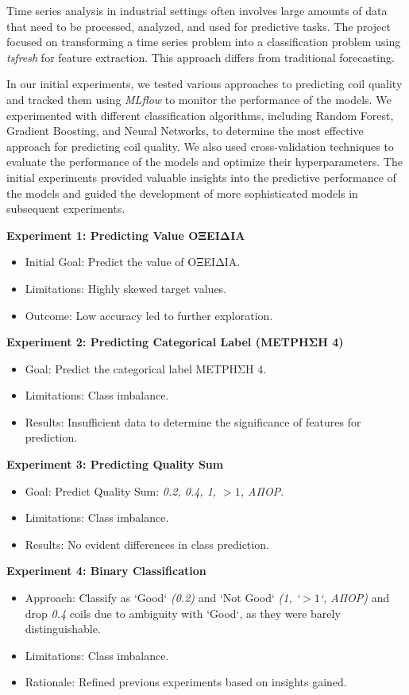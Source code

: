 Time series analysis in industrial settings often involves large amounts of
data that need to be processed, analyzed, and used for predictive tasks. The
project focused on transforming a time series problem into a classification
problem using \emph{tsfresh} for feature extraction. This approach differs from
traditional forecasting.

In our initial experiments, we tested various approaches to predicting coil
quality and tracked them using \emph{MLflow} to monitor the performance of the
models. We experimented with different classification algorithms, including
Random Forest, Gradient Boosting, and Neural Networks, to determine the most
effective approach for predicting coil quality. We also used cross-validation
techniques to evaluate the performance of the models and optimize their
hyperparameters. The initial experiments provided valuable insights into the
predictive performance of the models and guided the development of more
sophisticated models in subsequent experiments.

\textbf{Experiment 1: Predicting Value ΟΞΕΙΔΙΑ}
\begin{itemize}
    \item Initial Goal: Predict the value of ΟΞΕΙΔΙΑ.
    \item Limitations: Highly skewed target values.
    \item Outcome: Low accuracy led to further exploration.
\end{itemize}

\textbf{Experiment 2: Predicting Categorical Label (ΜΕΤΡΗΣΗ 4)}
\begin{itemize}
    \item Goal: Predict the categorical label ΜΕΤΡΗΣΗ 4.
    \item Limitations: Class imbalance.
    \item Results: Insufficient data to determine the significance of features for
          prediction.
\end{itemize}

\textbf{Experiment 3: Predicting Quality Sum}
\begin{itemize}
    \item Goal: Predict Quality Sum: \emph{0.2, 0.4, 1, $>1$, ΑΠΟΡ}.
    \item Limitations: Class imbalance.
    \item Results: No evident differences in class prediction.
\end{itemize}

\textbf{Experiment 4: Binary Classification}
\begin{itemize}
    \item Approach: Classify as `Good` \emph{(0.2)} and `Not Good` \emph{(1, `$>1$`,
              ΑΠΟΡ)} and drop \emph{0.4} coils due to ambiguity with `Good`, as they were
          barely distinguishable.
    \item Limitations: Class imbalance.
    \item Rationale: Refined previous experiments based on insights gained.
\end{itemize}

